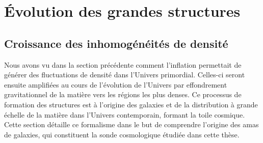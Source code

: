 \section{Évolution des grandes structures}

\subsection{Croissance des inhomogénéités de densité}

Nous avons vu dans la section précédente comment l'inflation permettait de générer des fluctuations de densité dans l'Univers primordial.
Celles-ci seront ensuite amplifiées au cours de l'évolution de l'Univers par effondrement gravitationnel de la matière vers les régions les plus denses.
Ce processus de formation des structures est à l'origine des galaxies et de la distribution à grande échelle de la matière dans l'Univers contemporain, formant la toile cosmique.
Cette section détaille ce formalisme dans le but de comprendre l'origine des amas de galaxies, qui constituent la sonde cosmologique étudiée dans cette thèse.

